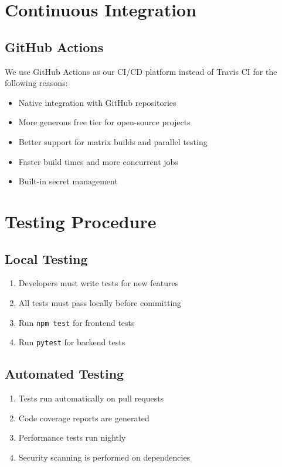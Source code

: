 \documentclass[12pt]{article}
\begin{document}
\section{Continuous Integration}

\subsection{GitHub Actions}
We use GitHub Actions as our CI/CD platform instead of Travis CI for the following reasons:
\begin{itemize}
    \item Native integration with GitHub repositories
    \item More generous free tier for open-source projects
    \item Better support for matrix builds and parallel testing
    \item Faster build times and more concurrent jobs
    \item Built-in secret management
\end{itemize}

\section{Testing Procedure}

\subsection{Local Testing}
\begin{enumerate}
    \item Developers must write tests for new features
    \item All tests must pass locally before committing
    \item Run \texttt{npm test} for frontend tests
    \item Run \texttt{pytest} for backend tests
\end{enumerate}

\subsection{Automated Testing}
\begin{enumerate}
    \item Tests run automatically on pull requests
    \item Code coverage reports are generated
    \item Performance tests run nightly
    \item Security scanning is performed on dependencies
\end{enumerate}
\end{document}
